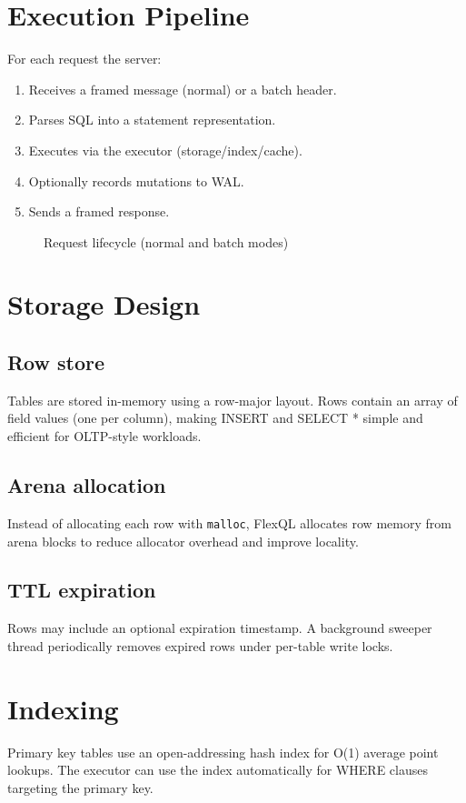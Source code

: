 \documentclass[11pt,a4paper]{article}
\begin{document}
\section{Execution Pipeline}
For each request the server:
\begin{enumerate}
  \item Receives a framed message (normal) or a batch header.
  \item Parses SQL into a statement representation.
  \item Executes via the executor (storage/index/cache).
  \item Optionally records mutations to WAL.
  \item Sends a framed response.
\end{enumerate}

\begin{figure}[H]
\centering

\caption{Request lifecycle (normal and batch modes)}
\end{figure}

\section{Storage Design}
\subsection{Row store}
Tables are stored in-memory using a row-major layout. Rows contain an array of field values (one per column), making INSERT and SELECT * simple and efficient for OLTP-style workloads.

\subsection{Arena allocation}
Instead of allocating each row with \texttt{malloc}, FlexQL allocates row memory from arena blocks to reduce allocator overhead and improve locality.

\subsection{TTL expiration}
Rows may include an optional expiration timestamp. A background sweeper thread periodically removes expired rows under per-table write locks.

\section{Indexing}
Primary key tables use an open-addressing hash index for O(1) average point lookups. The executor can use the index automatically for WHERE clauses targeting the primary key.
\end{document}
